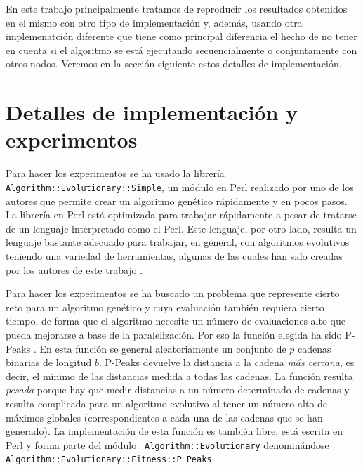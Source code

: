 \documentclass{article}
\begin{document}
En este trabajo principalmente tratamos de reproducir los resultados
obtenidos en el mismo con otro tipo de implementación y, además,  %
usando otra implemenatción diferente que tiene como principal
diferencia el hecho de no tener en cuenta si el algoritmo se está
ejecutando secuencialmente o conjuntamente con otros nodos. Veremos en
la sección siguiente estos detalles de implementación. 

\section{Detalles de implementación y experimentos}
\label{sec:imp}

Para hacer los experimentos se ha usado la librería {\tt
  Algorithm::Evolutionary::Simple}, un módulo en Perl realizado por
uno de los autores que permite crear un algoritmo genético rápidamente
y en pocos pasos. La librería en Perl está optimizada para trabajar
rápidamente \cite{DBLP:conf/iwann/MereloRACML11} a pesar de tratarse
de un lenguaje interpretado como el Perl. Este lenguaje, por otro lado, resulta
un lenguaje bastante adecuado para trabajar, en general, con
algoritmos evolutivos teniendo una variedad de herramientas, algunas
de las cuales han sido creadas por los autores de este trabajo
\cite{perl-ea}.

Para hacer los experimentos se ha buscado un problema que represente
cierto reto para un algoritmo genético y cuya evaluación también
requiera cierto tiempo, de forma que el algoritmo necesite un número
de evaluaciones alto que pueda mejorarse a base de la
paralelización. Por eso la función elegida ha sido P-Peaks
\cite{alba2002comparing}. En esta función se general aleatoriamente un conjunto
de $p$ cadenas binarias de longitud $b$. P-Peaks devuelve la distancia
a la cadena {\em más cercana}, es decir, el mínimo de las distancias
medida a todas las cadenas. La función resulta {\em pesada} porque hay
que medir distancias a un número determinado de cadenas y resulta
complicada para un algoritmo evolutivo al tener un número alto de
máximos globales (correspondientes a cada una de las cadenas que se
han generado). La implementación de esta función es también libre,
está escrita en Perl y forma parte del módulo {\tt
  Algorithm::Evolutionary} denominándose {\tt
  Algorithm::Evolutionary::Fitness::P\_Peaks}. 
\end{document}
